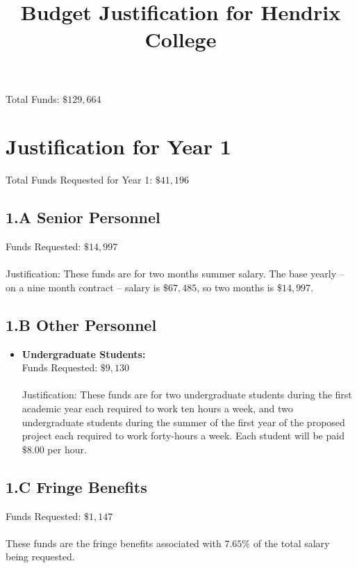 \documentclass[11pt]{article}
\title{\vspace{-50px}Budget Justification for Hendrix College}
\date{\vspace{-60px}}
\begin{document}
\maketitle  

\noindent
Total Funds: $\$129,664$\\
\vspace{-20px}
\section{Justification for Year 1}
\label{sec:year_1}
Total Funds Requested for Year 1: $\$41,196$\\
\vspace{-20px}
\subsection*{1.A Senior Personnel}
\label{subsec:a_senior_personnel}

Funds Requested: $\$14,997$\\ \ \\ Justification: These funds are for
two months summer salary. The base yearly -- on a nine month contract
-- salary is $\$67,485$, so two months is $\$14,997$.  

\subsection*{1.B Other Personnel}
\label{subsec:personnel}
\begin{itemize}

\item \textbf{Undergraduate Students:}\\ Funds Requested:
  $\$9,130$\\ \ \\ Justification: These funds are for two
  undergraduate students during the first academic year each required
  to work ten hours a week, and two undergraduate students during the
  summer of the first year of the proposed project each required to
  work forty-hours a week.  Each student will be paid $\$8.00$ per
  hour.
\end{itemize}

\subsection*{1.C Fringe Benefits}
\label{subsec:c_fringe_benefits}
Funds Requested: $\$1,147$\\ \ \\ These funds are the fringe benefits
associated with $7.65\%$ of the total salary being requested.
\end{document}
